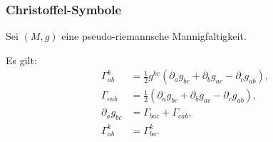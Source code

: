 \subsubsection{Christoffel-Symbole}
Sei $(M,g)$ eine pseudo-riemannsche Mannigfaltigkeit.

Es gilt:
\begin{align}
\Gamma_{ab}^k &= \frac{1}{2} g^{kc}
(\partial_a g_{bc}+\partial_b g_{ac}-\partial_c g_{ab}),\\
\Gamma_{cab} &= \frac{1}{2}
(\partial_a g_{bc}+\partial_b g_{ac}-\partial_c g_{ab}),\\
\partial_a g_{bc} &= \Gamma_{bac}+\Gamma_{cab},\\
\Gamma_{ab}^k &= \Gamma_{ba}^k.
\end{align}


